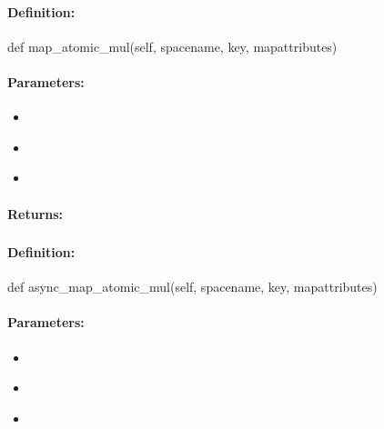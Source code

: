 \paragraph{Definition:}
\begin{pythoncode}
def map_atomic_mul(self, spacename, key, mapattributes)
\end{pythoncode}

\paragraph{Parameters:}
\begin{itemize}[noitemsep]
\item {}\\

\item {}\\

\item {}\\

\end{itemize}

\paragraph{Returns:}


\pagebreak
\subsubsection{}
\label{api:python:async_map_atomic_mul}


\paragraph{Definition:}
\begin{pythoncode}
def async_map_atomic_mul(self, spacename, key, mapattributes)
\end{pythoncode}

\paragraph{Parameters:}
\begin{itemize}[noitemsep]
\item {}\\

\item {}\\

\item {}\\

\end{itemize}

